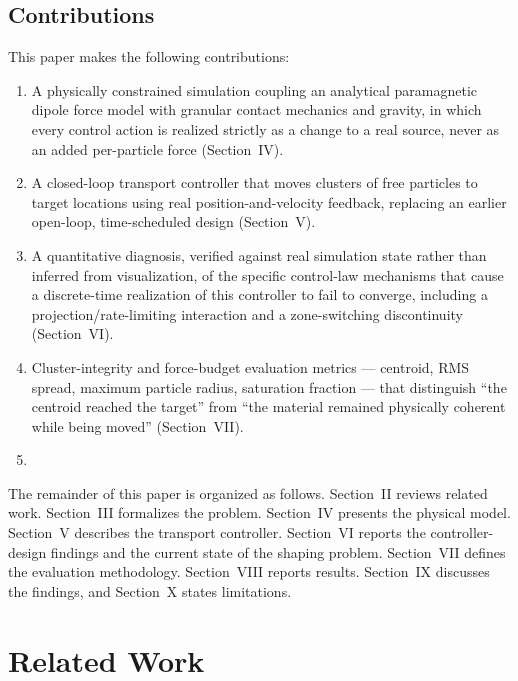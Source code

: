 \documentclass[journal]{IEEEtran}
\begin{document}
\subsection{Contributions}
This paper makes the following contributions:
\begin{enumerate}
\item A physically constrained simulation coupling an analytical
paramagnetic dipole force model with granular contact mechanics and
gravity, in which every control action is realized strictly as a change to
a real source, never as an added per-particle force (Section~IV).
\item A closed-loop transport controller that moves clusters of free
particles to target locations using real position-and-velocity feedback,
replacing an earlier open-loop, time-scheduled design (Section~V).
\item A quantitative diagnosis, verified against real simulation state
rather than inferred from visualization, of the specific control-law
mechanisms that cause a discrete-time realization of this controller to
fail to converge, including a projection/rate-limiting interaction and a
zone-switching discontinuity (Section~VI).
\item Cluster-integrity and force-budget evaluation metrics --- centroid,
RMS spread, maximum particle radius, saturation fraction --- that
distinguish ``the centroid reached the target'' from ``the material
remained physically coherent while being moved'' (Section~VII).
\item [PLACEHOLDER: shaping-stage contribution, pending validation of the
coverage-feedback traveling-well design in Section~VI-D.]
\end{enumerate}

The remainder of this paper is organized as follows. Section~II reviews
related work. Section~III formalizes the problem. Section~IV presents the
physical model. Section~V describes the transport controller. Section~VI
reports the controller-design findings and the current state of the
shaping problem. Section~VII defines the evaluation methodology.
Section~VIII reports results. Section~IX discusses the findings, and
Section~X states limitations.

\section{Related Work}
\end{document}
